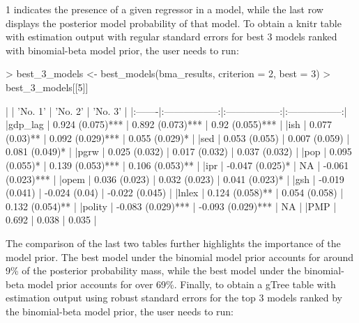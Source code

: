 \documentclass[a4paper]{article}
\begin{document}
1 indicates the presence of a given regressor in a model, while the last row displays the posterior model probability of that model.
To obtain a knitr table with estimation output with regular standard errors for best 3 models ranked with binomial-beta model prior, the user needs to run:

\begin{Schunk}
\begin{Sinput}
> best_3_models <- best_models(bma_results, criterion = 2, best = 3)
> best_3_models[[5]]
\end{Sinput}
\begin{Soutput}
|        |      'No. 1'      |      'No. 2'      |      'No. 3'      |
|:-------|:-----------------:|:-----------------:|:-----------------:|
|gdp_lag | 0.924 (0.075)***  | 0.892 (0.073)***  |  0.92 (0.055)***  |
|ish     |  0.077 (0.03)**   | 0.092 (0.029)***  |  0.055 (0.029)*   |
|sed     |   0.053 (0.055)   |   0.007 (0.059)   |  0.081 (0.049)*   |
|pgrw    |   0.025 (0.032)   |   0.017 (0.032)   |   0.037 (0.032)   |
|pop     |  0.095 (0.055)*   | 0.139 (0.053)***  |  0.106 (0.053)**  |
|ipr     |  -0.047 (0.025)*  |        NA         | -0.061 (0.023)*** |
|opem    |   0.036 (0.023)   |   0.032 (0.023)   |  0.041 (0.023)*   |
|gsh     |  -0.019 (0.041)   |   -0.024 (0.04)   |  -0.022 (0.045)   |
|lnlex   |  0.124 (0.058)**  |   0.054 (0.058)   |  0.132 (0.054)**  |
|polity  | -0.083 (0.029)*** | -0.093 (0.029)*** |        NA         |
|PMP     |       0.692       |       0.038       |       0.035       |
\end{Soutput}
\end{Schunk}

The comparison of the last two tables further highlights the importance of the model prior.
The best model under the binomial model prior accounts for around 9\% of the posterior probability mass,
while the best model under the binomial-beta model prior accounts for over 69\%.
Finally, to obtain a gTree table with estimation output using robust standard errors for the top 3 models ranked by the binomial-beta model prior,
the user needs to run:
\end{document}
